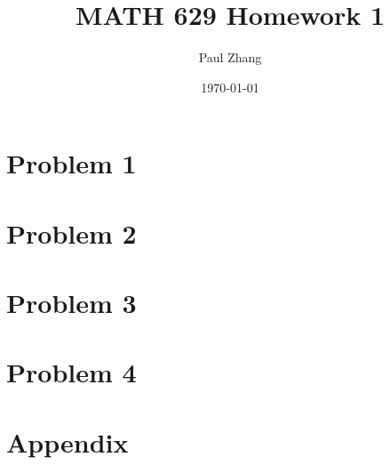 \documentclass{article}
\title{\Large\bf MATH 629 Homework 1}
\author{\normalsize Paul Zhang}
\date{\normalsize\today}
\begin{document}
\maketitle
\small
\section*{Problem 1}


\section*{Problem 2}


\section*{Problem 3}

\section*{Problem 4}


\section*{Appendix}
\end{document}
